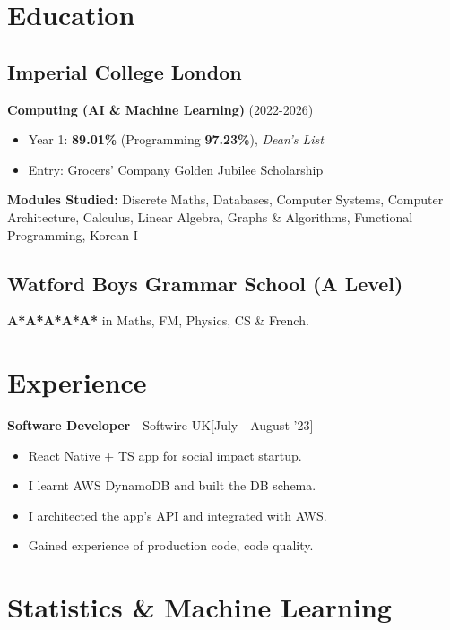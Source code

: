 \documentclass{Resume}
\begin{document}

	\section{Education}
		\subsection{Imperial College London}
	\textbf{Computing (AI \& Machine Learning)} (2022-2026)
 \begin{itemize}
     \item Year 1: \textbf{89.01\%} (Programming \textbf{97.23\%}), \textit{Dean's List}
     \item Entry: Grocers' Company Golden Jubilee Scholarship
 \end{itemize}
\textbf{Modules Studied:} Discrete Maths, Databases, Computer Systems, Computer Architecture, Calculus, Linear Algebra, Graphs \& Algorithms, Functional Programming, Korean I
    
		\subsection{Watford Boys Grammar School (A Level)}
		    \textbf{A*A*A*A*A*} in Maths, FM, Physics, CS \& French.

        \section{Experience}
            \textbf{Software Developer} - Softwire UK\hfill [July - August '23]
            \begin{itemize}
                \item React Native + TS app for social impact startup.
                \item I learnt AWS DynamoDB and built the DB schema.
                \item I architected the app's API and integrated with AWS. 
                \item Gained experience of production code,  code quality.
            \end{itemize}

	\section{Statistics \& Machine Learning}
\end{document}
